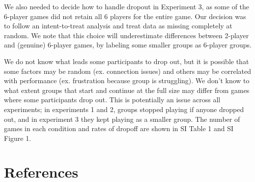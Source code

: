 \documentclass[
  english,
]{article}
\begin{document}
We also needed to decide how to handle dropout in Experiment 3, as some of the 6-player games did not retain all 6 players for the entire game.
Our decision was to follow an intent-to-treat analysis and treat data as missing completely at random.
We note that this choice will underestimate differences between 2-player and (genuine) 6-player games, by labeling some smaller groups as 6-player groups.

We do not know what leads some participants to drop out, but it is possible that some factors may be random (ex. connection issues) and others may be correlated with performance (ex. frustration because group is struggling). We don't know to what extent groups that start and continue at the full size may differ from games where some participants drop out. This is potentially an issue across all experiments; in experiments 1 and 2, groups stopped playing if anyone dropped out, and in experiment 3 they kept playing as a smaller group. The number of games in each condition and rates of dropoff are shown in SI Table 1 and SI Figure 1.

\hypertarget{references}{%
\section{References}\label{references}}

\setlength{\parindent}{-0.1in} 
\setlength{\leftskip}{0.125in}

\noindent
\end{document}
